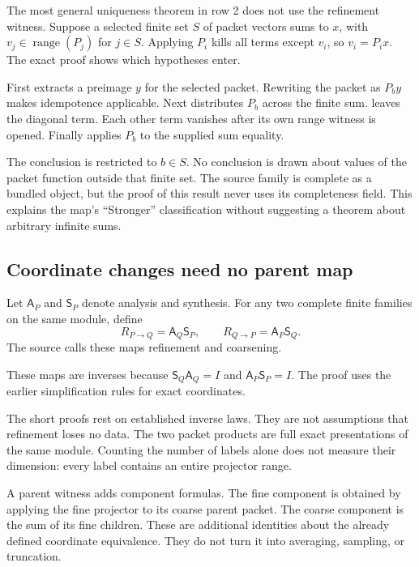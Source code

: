 The most general uniqueness theorem in row 2 does not use the refinement witness. Suppose a selected finite set $S$ of packet vectors sums to $x$, with $v_j\in\operatorname{range}(P_j)$ for $j\in S$. Applying $P_i$ kills all terms except $v_i$, so $v_i=P_i x$. The exact proof shows which hypotheses enter.

First  extracts a preimage $y$ for the selected packet. Rewriting the packet as $P_b y$ makes idempotence applicable. Next  distributes $P_b$ across the finite sum.  leaves the diagonal term. Each other term vanishes after its own range witness is opened. Finally  applies $P_b$ to the supplied sum equality.

The conclusion is restricted to $b\in S$. No conclusion is drawn about values of the packet function outside that finite set. The source family is complete as a bundled object, but the proof of this result never uses its completeness field. This explains the map's ``Stronger'' classification without suggesting a theorem about arbitrary infinite sums.

\subsection{Coordinate changes need no parent map}

Let $\mathsf A_P$ and $\mathsf S_P$ denote analysis and synthesis. For any two complete finite families on the same module, define
\[
R_{P\to Q}=\mathsf A_Q\mathsf S_P,
\qquad R_{Q\to P}=\mathsf A_P\mathsf S_Q.
\]
The source calls these maps refinement and coarsening.

These maps are inverses because $\mathsf S_Q\mathsf A_Q=I$ and $\mathsf A_P\mathsf S_P=I$. The proof uses the earlier simplification rules for exact coordinates.

The short  proofs rest on established inverse laws. They are not assumptions that refinement loses no data. The two packet products are full exact presentations of the same module. Counting the number of labels alone does not measure their dimension: every label contains an entire projector range.

A parent witness adds component formulas. The fine component is obtained by applying the fine projector to its coarse parent packet. The coarse component is the sum of its fine children. These are additional identities about the already defined coordinate equivalence. They do not turn it into averaging, sampling, or truncation.

